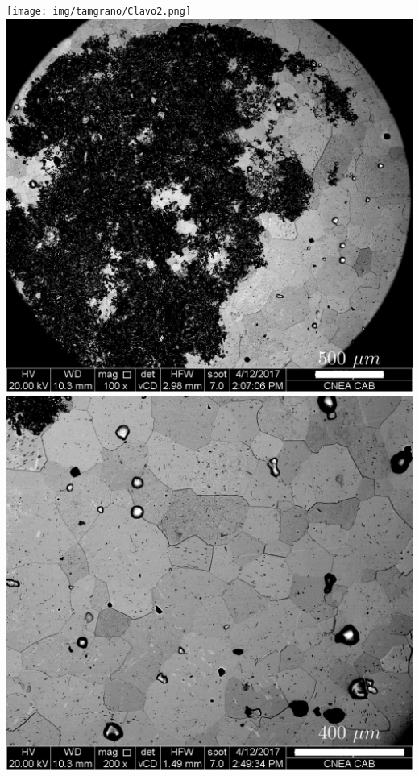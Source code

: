 \documentclass[usenames,dvipsnames]{beamer}
\begin{document}
\begin{frame}
\begin{columns}
\texttt{[image: img/tamgrano/Clavo2.png]}
\includegraphics[width=\textwidth]{img/tamgrano/Clavo1Retro.png}
\includegraphics[width=\textwidth]{img/tamgrano/Clavo1Retro2.png}
\end{columns}

\end{frame}
\end{document}
